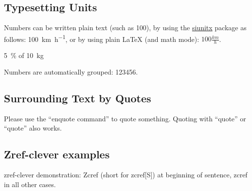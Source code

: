 
\subsection{Typesetting Units}

\begin{ltgexample}
Numbers can be written plain text (such as 100), by using the \href{https://ctan.org/pkg/siunitx}{siunitx} package as follows:
\SI{100}{\km\per\hour},
or by using plain \LaTeX{} (and math mode):
$100 \frac{\mathit{km}}{h}$.
\end{ltgexample}

\begin{ltgexample}
\SI{5}{\percent} of \SI{10}{kg}
\end{ltgexample}

\begin{ltgexample}
Numbers are automatically grouped: \num{123456}.
\end{ltgexample}

\subsection{Surrounding Text by Quotes}

\begin{ltgexample}
Please use the \enquote{enquote command} to quote something.
Quoting with "`quote"' or ``quote'' also works.

\end{ltgexample}

\subsection{Zref-clever examples}
\label{sec:ex:cref}

zref-clever demonstration: Zcref (short for zcref[S]) at beginning of sentence, zcref in all other cases.


